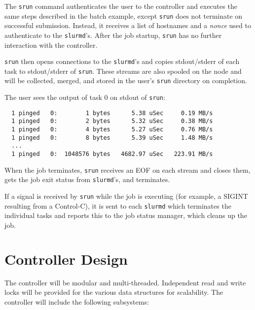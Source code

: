 The {\tt srun} command authenticates the user to the controller and 
executes the same steps described in the batch example, except {\tt srun} 
does not terminate on successful submission.  Instead, it receives a list of
hostnames and a {\em nonce} used to authenticate to the {\tt slurmd}'s.
After the job startup, {\tt srun} has no further interaction with the 
controller.

{\tt srun} then opens connections to the {\tt slurmd}'s and copies 
stdout/stderr of each task to stdout/stderr of {\tt srun}.  These streams
are also spooled on the node and will be collected, merged, and stored
in the user's {\tt srun} directory on completion.

The user sees the output of task 0 on stdout of {\tt srun}:

\begin{verbatim}
  1 pinged   0:        1 bytes      5.38 uSec     0.19 MB/s                     
  1 pinged   0:        2 bytes      5.32 uSec     0.38 MB/s                     
  1 pinged   0:        4 bytes      5.27 uSec     0.76 MB/s                     
  1 pinged   0:        8 bytes      5.39 uSec     1.48 MB/s                     
  ...
  1 pinged   0:  1048576 bytes   4682.97 uSec   223.91 MB/s              
\end{verbatim}

When the job terminates, {\tt srun} receives an EOF on each stream and
closes them, gets the job exit status from {\tt slurmd}'s, and terminates.

If a signal is received by {\tt srun} while the job is executing (for example,
a SIGINT resulting from a Control-C), it is sent to each {\tt slurmd} which 
terminates the individual tasks and reports this to the job status manager,
which cleans up the job.


\section{Controller Design}

The controller will be modular and multi-threaded. 
Independent read and write locks will be provided for the various data 
structures for scalability. 
The controller  will include the following subsystems:

